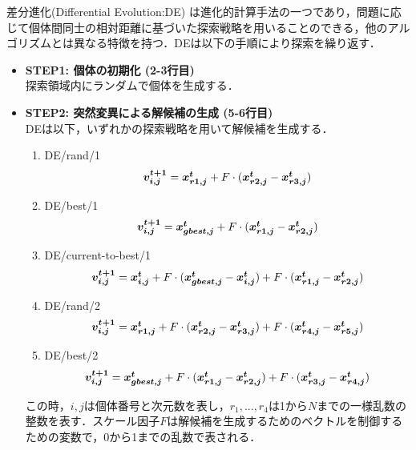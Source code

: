 \documentclass[a4j,11pt]{jarticle}
\begin{document}
差分進化(Differential Evolution:DE) \cite{DE} は進化的計算手法の一つであり，問題に応じて個体間同士の相対距離に基づいた探索戦略を用いることのできる，他のアルゴリズムとは異なる特徴を持つ．DEは以下の手順により探索を繰り返す．
\begin{itemize}
\item {\bf STEP1: 個体の初期化 (2-3行目)} \\
探索領域内にランダムで個体を生成する．
\item {\bf STEP2: 突然変異による解候補の生成 (5-6行目)} \\
DEは以下，いずれかの探索戦略を用いて解候補を生成する．
\begin{enumerate}
\item{DE/rand/1}
\begin{equation}
\label{eq:rand1}
\mbox{\boldmath $v_{i,j}^{t+1}$}=\mbox{\boldmath $x_{r1,j}^t$}+F \cdot (\mbox{\boldmath $x_{r2,j}^t$}-\mbox{\boldmath $x_{r3,j}^t$})
\end{equation}
\item{DE/best/1}
\begin{equation}
\label{eq:best1}
\mbox{\boldmath $v_{i,j}^{t+1}$}=\mbox{\boldmath $x_{gbest,j}^t$}+F \cdot (\mbox{\boldmath $x_{r1,j}^t$}-\mbox{\boldmath $x_{r2,j}^t$})
\end{equation}
\item{DE/current-to-best/1}
\begin{equation}
\label{eq:cur2best1}
\mbox{\boldmath $v_{i,j}^{t+1}$}=\mbox{\boldmath $x_{i,j}^t$}+F \cdot (\mbox{\boldmath $x_{gbest,j}^t$}-\mbox{\boldmath $x_{i,j}^t$})+F \cdot (\mbox{\boldmath $x_{r1,j}^t$}-\mbox{\boldmath $x_{r2,j}^t$})
\end{equation}
\item{DE/rand/2}
\begin{equation}
\label{eq:rand2}
\mbox{\boldmath $v_{i,j}^{t+1}$}=\mbox{\boldmath $x_{r1,j}^t$}+F \cdot (\mbox{\boldmath $x_{r2,j}^t$}-\mbox{\boldmath $x_{r3,j}^t$})+F\cdot (\mbox{\boldmath $x_{r4,j}^t$}-\mbox{\boldmath $x_{r5,j}^t$})
\end{equation}
\item{DE/best/2}
\begin{equation}
\label{eq:best2}
\mbox{\boldmath $v_{i,j}^{t+1}$}=\mbox{\boldmath $x_{gbest,j}^t$}+F \cdot (\mbox{\boldmath $x_{r1,j}^t$}-\mbox{\boldmath $x_{r2,j}^t$})+F \cdot (\mbox{\boldmath $x_{r3,j}^t$}-\mbox{\boldmath $x_{r4,j}^t$})
\end{equation}
\end{enumerate}
この時，$i,j$は個体番号と次元数を表し，$r_1,...,r_4$は1から$N$までの一様乱数の整数を表す．スケール因子$F$は解候補を生成するためのベクトルを制御するための変数で，0から1までの乱数で表される．

\end{itemize}
\end{document}
